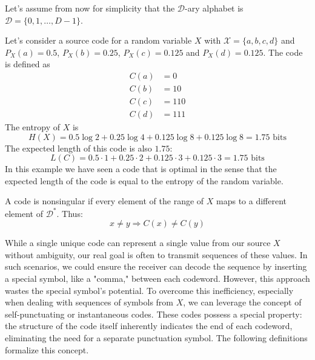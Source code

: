 \noindent Let's assume from now for simplicity that the $\mathcal{D}$-ary alphabet is $\mathcal{D} = \{0, 1, \ldots, D-1\}$.

\begin{example}\label{ex:source_code}
    Let's consider a source code for a random variable $X$ with $\mathcal{X} = \{a, b, c, d\}$ and $P_X(a) = 0.5$, $P_X(b) = 0.25$, $P_X(c) = 0.125$ and $P_X(d) = 0.125$. The code is defined as
    \begin{align*}
        C(a) & = 0   \\
        C(b) & = 10  \\
        C(c) & = 110 \\
        C(d) & = 111
    \end{align*}
    The entropy of $X$ is
    \begin{equation*}
        H(X) = 0.5\log 2 + 0.25\log 4 + 0.125\log 8 + 0.125\log 8 = 1.75 \text{ bits}
    \end{equation*}
    The expected length of this code is also $1.75$:
    \begin{equation*}
        L(C) = 0.5 \cdot 1 + 0.25 \cdot 2 + 0.125 \cdot 3 + 0.125 \cdot 3 = 1.75 \text{ bits}
    \end{equation*}
    In this example we have seen a code that is optimal in the sense that the expected length of the code is equal to the entropy of the random variable.
\end{example}

\begin{example}\label{ex:morse_code}
\end{example}

\begin{definition}\label{def:nonsingular_code}
    A code is nonsingular if every element of the range of $X$ maps to a different element of $\mathcal{D}^*$. Thus:
    \begin{equation}
        x \neq y \Rightarrow C(x) \neq C(y)
    \end{equation}
\end{definition}

\noindent While a single unique code can represent a single value from our source $X$ without ambiguity, our real goal is often to transmit sequences of these values. In such scenarios, we could ensure the receiver can decode the sequence by inserting a special symbol, like a "comma," between each codeword. However, this approach wastes the special symbol's potential. To overcome this inefficiency, especially when dealing with sequences of symbols from $X$, we can leverage the concept of self-punctuating or instantaneous codes. These codes possess a special property: the structure of the code itself inherently indicates the end of each codeword, eliminating the need for a separate punctuation symbol. The following definitions formalize this concept. \cite{ElementsofInformationTheory}

